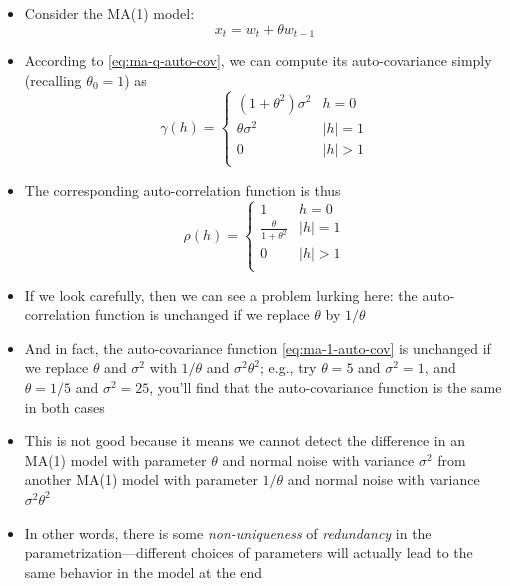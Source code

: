 \documentclass{article}
\begin{document}
\begin{itemize}
\item Consider the MA(1) model:
  \begin{equation}
  \label{eq:ma-1}
  x_t = w_t + \theta w_{t-1}
  \end{equation}

\item According to \eqref{eq:ma-q-auto-cov}, we can compute its auto-covariance 
  simply (recalling $\theta_0 = 1$) as
  \begin{equation}
  \label{eq:ma-1-auto-cov}  
  \gamma(h) = \begin{cases}
  (1+\theta^2) \sigma^2 & h = 0 \\
  \theta \sigma^2 & |h| = 1 \\
  0 & |h| > 1 \\
  \end{cases}
  \end{equation}

\item The corresponding auto-correlation function is thus
  \[
  \rho(h) = \begin{cases}
  1 & h = 0 \\
  \frac{\theta}{1+\theta^2} & |h| = 1 \\ 
  0 & |h| > 1 \\
  \end{cases}
  \]

\item If we look carefully, then we can see a problem lurking here: the
  auto-correlation function is unchanged if we replace $\theta$ by $1/\theta$

\item And in fact, the auto-covariance function \eqref{eq:ma-1-auto-cov} is
  unchanged if we replace $\theta$ and $\sigma^2$ with $1/\theta$ and $\sigma^2
  \theta^2$; e.g., try $\theta = 5$ and $\sigma^2 = 1$, and $\theta = 1/5$ and
  $\sigma^2 = 25$, you'll find that the auto-covariance function is the same in
  both cases 

\item This is not good because it means we cannot detect the difference in an
  MA(1) model with parameter $\theta$ and normal noise with variance $\sigma^2$ 
  from another MA(1) model with parameter $1/\theta$ and normal noise with
  variance $\sigma^2 \theta^2$

\item In other words, there is some \emph{non-uniqueness} of \emph{redundancy}
  in the parametrization---different choices of parameters will actually lead to
  the same behavior in the model at the end


\end{itemize}
\end{document}
